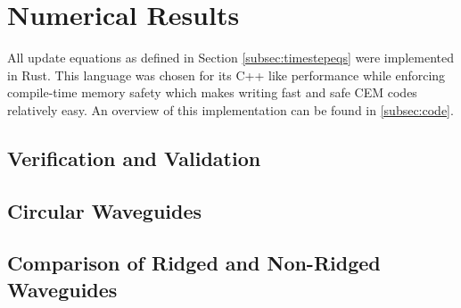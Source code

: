 \section{Numerical Results}
\label{sec:numres} 
All update equations as defined in Section \ref{subsec:timestepeqs} were implemented in Rust. This language was chosen for its C++ like performance while enforcing compile-time memory safety which makes writing fast and safe CEM codes relatively easy. An overview of this implementation can be found in \ref{subsec:code}.

\subsection{Verification and Validation}
\label{subsec:vv}


\subsection{Circular Waveguides}
\label{subsec:circ_guides}

\subsection{Comparison of Ridged and Non-Ridged Waveguides}
\label{subsec:rid_guides}
